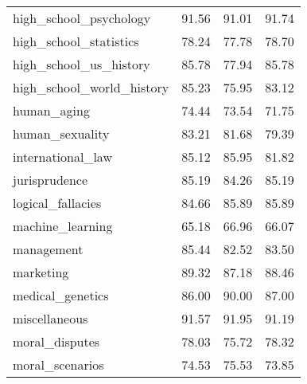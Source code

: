 \begin{table}[t]
\begin{tabular}{L{0.35}C{0.15}C{0.15}C{0.15}}
        high\_school\_psychology                & 91.56                    & 91.01                & 91.74                      \\
        high\_school\_statistics                & 78.24                    & 77.78                & 78.70                      \\
        high\_school\_us\_history               & 85.78                    & 77.94                & 85.78                      \\
        high\_school\_world\_history            & 85.23                    & 75.95                & 83.12                      \\
        human\_aging                            & 74.44                    & 73.54                & 71.75                      \\
        human\_sexuality                        & 83.21                    & 81.68                & 79.39                      \\
        international\_law                      & 85.12                    & 85.95                & 81.82                      \\
        jurisprudence                           & 85.19                    & 84.26                & 85.19                      \\
        logical\_fallacies                      & 84.66                    & 85.89                & 85.89                      \\
        machine\_learning                       & 65.18                    & 66.96                & 66.07                      \\
        management                              & 85.44                    & 82.52                & 83.50                      \\
        marketing                               & 89.32                    & 87.18                & 88.46                      \\
        medical\_genetics                       & 86.00                    & 90.00                & 87.00                      \\
        miscellaneous                           & 91.57                    & 91.95                & 91.19                      \\
        moral\_disputes                         & 78.03                    & 75.72                & 78.32                      \\
        moral\_scenarios                        & 74.53                    & 75.53                & 73.85                      \\

\end{tabular}
\end{table}
